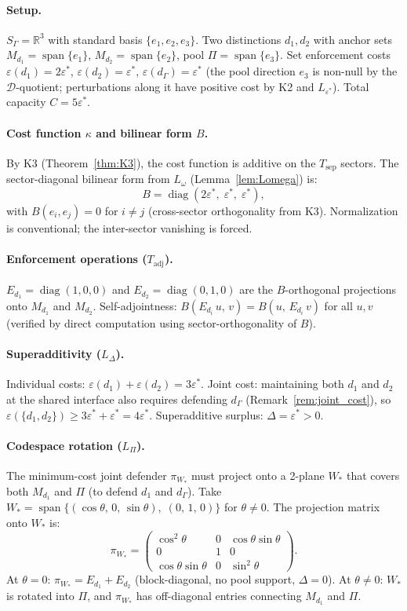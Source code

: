 \documentclass[11pt,a4paper]{article}
\theoremstyle{definition}
\newcommand{\eps}{\varepsilon}
\DeclareMathOperator{\spn}{span}
\DeclareMathOperator{\diag}{diag}
\begin{document}
\paragraph{Setup.}
$S_\Gamma = \mathbb{R}^3$ with standard basis $\{e_1, e_2, e_3\}$.  Two distinctions $d_1, d_2$ with anchor sets $M_{d_1} = \spn\{e_1\}$, $M_{d_2} = \spn\{e_2\}$, pool $\Pi = \spn\{e_3\}$.  Set enforcement costs $\eps(d_1) = 2\eps^*$, $\eps(d_2) = \eps^*$, $\eps(d_\Gamma) = \eps^*$ (the pool direction $e_3$ is non-null by the $\mathcal{D}$-quotient; perturbations along it have positive cost by K2 and $L_{\eps^*}$).  Total capacity $C = 5\eps^*$.

\paragraph{Cost function $\kappa$ and bilinear form $B$.}
By K3 (Theorem~\ref{thm:K3}), the cost function is additive on the $T_{\mathrm{sep}}$ sectors.  The sector-diagonal bilinear form from $L_\omega$ (Lemma~\ref{lem:Lomega}) is:
\[
B = \diag(2\eps^*, \;\eps^*, \;\eps^*),
\]
with $B(e_i, e_j) = 0$ for $i \ne j$ (cross-sector orthogonality from K3).  Normalization is conventional; the inter-sector vanishing is forced.

\paragraph{Enforcement operations ($T_{\mathrm{adj}}$).}
$E_{d_1} = \diag(1,0,0)$ and $E_{d_2} = \diag(0,1,0)$ are the $B$-orthogonal projections onto $M_{d_1}$ and $M_{d_2}$.  Self-adjointness: $B(E_{d_i}\,u,\, v) = B(u,\, E_{d_i}\,v)$ for all $u, v$ (verified by direct computation using sector-orthogonality of $B$).

\paragraph{Superadditivity ($L_\Delta$).}
Individual costs: $\eps(d_1) + \eps(d_2) = 3\eps^*$.  Joint cost: maintaining both $d_1$ and $d_2$ at the shared interface also requires defending $d_\Gamma$ (Remark~\ref{rem:joint_cost}), so $\eps(\{d_1, d_2\}) \ge 3\eps^* + \eps^* = 4\eps^*$.  Superadditive surplus: $\Delta = \eps^* > 0$.

\paragraph{Codespace rotation ($L_\Pi$).}
The minimum-cost joint defender $\pi_{W_*}$ must project onto a 2-plane $W_*$ that covers both $M_{d_1}$ and $\Pi$ (to defend $d_1$ and $d_\Gamma$).  Take $W_* = \spn\{(\cos\theta,\, 0,\, \sin\theta),\; (0,\, 1,\, 0)\}$ for $\theta \ne 0$.  The projection matrix onto $W_*$ is:
\[
\pi_{W_*} = \begin{pmatrix} \cos^2\theta & 0 & \cos\theta\sin\theta \\ 0 & 1 & 0 \\ \cos\theta\sin\theta & 0 & \sin^2\theta \end{pmatrix}.
\]
At $\theta = 0$: $\pi_{W_*} = E_{d_1} + E_{d_2}$ (block-diagonal, no pool support, $\Delta = 0$).  At $\theta \ne 0$: $W_*$ is rotated into $\Pi$, and $\pi_{W_*}$ has off-diagonal entries connecting $M_{d_1}$ and $\Pi$.
\end{document}

